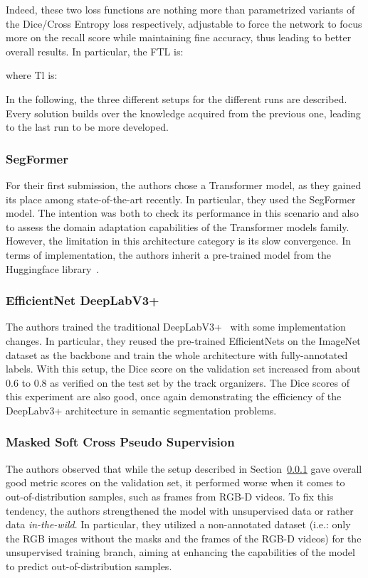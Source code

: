 \documentclass[twocolumn]{article}
\begin{document}
Indeed, these two loss functions are nothing more than parametrized variants of the Dice/Cross Entropy loss respectively, adjustable to force the network to focus more on the recall score while maintaining fine accuracy, thus leading to better overall results. In particular, the FTL is: 

where Tl is:


In the following, the three different setups for the different runs are described. Every solution builds over the knowledge acquired from the previous one, leading to the last run to be more developed.

\subsubsection{SegFormer}
\label{sec:segFormer}
For their first submission, the authors chose a Transformer model, as they gained its place among state-of-the-art recently. In particular, they used the SegFormer~\cite{xie2021segformer} model. The intention was both to check its performance in this scenario and also to assess the domain adaptation capabilities of the Transformer models family. However, the limitation in this architecture category is its slow convergence. In terms of implementation, the authors inherit a pre-trained model from the Huggingface library~\cite{huggingface}. 

\subsubsection{EfficientNet DeepLabV3+}
The authors trained the traditional DeepLabV3+~\cite{chen2018encoder} with some implementation changes. In particular, they reused the pre-trained EfficientNets \cite{tan2019efficientnet} on the ImageNet dataset as the backbone and train the whole architecture with fully-annotated labels. With this setup, the Dice score on the validation set increased from about 0.6 to 0.8 as verified on the test set by the track organizers. The Dice scores of this experiment are also good, once again demonstrating the efficiency of the DeepLabv3+ architecture in semantic segmentation problems.

\subsubsection{Masked Soft Cross Pseudo Supervision}
\label{sec:mscps}
The authors observed that while the setup described in Section~\ref{sec:segFormer} gave overall good metric scores on the validation set, it performed worse when it comes to out-of-distribution samples, such as frames from RGB-D videos. To fix this tendency, the authors strengthened the model with unsupervised data or rather data \emph{in-the-wild}. In particular, they utilized a non-annotated dataset (i.e.: only the RGB images without the masks and the frames of the RGB-D videos) for the unsupervised training branch, aiming at enhancing the capabilities of the model to predict out-of-distribution samples. 
\end{document}
